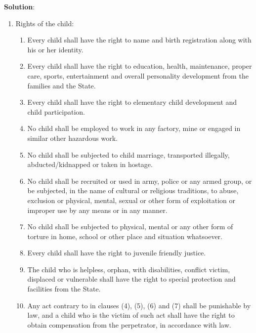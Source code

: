\documentclass[
]{book}
\newenvironment{solution}{ {\bfseries Solution}:}{}
\begin{document}
\begin{questions}
\begin{solution}
\begin{enumerate}
\item Rights of the child:
\begin{enumerate}
\item Every child shall have the right to name and birth registration along with his or her identity.
\item Every child shall have the right to education, health, maintenance, proper care, sports, entertainment and overall personality development from the families and the State.
\item Every child shall have the right to elementary child development and child participation.
\item No child shall be employed to work in any factory, mine or engaged in similar other hazardous work.
\item No child shall be subjected to child marriage, transported illegally, abducted/kidnapped or taken in hostage.
\item No child shall be recruited or used in army, police or any armed group, or be subjected, in the name of cultural or religious traditions, to abuse, exclusion or physical, mental, sexual or other form of exploitation or improper use by any means or in any manner.
\item No child shall be subjected to physical, mental or any other form of torture in home, school or other place and situation whatsoever.
\item Every child shall have the right to juvenile friendly justice.
\item The child who is helpless, orphan, with disabilities, conflict victim, displaced or vulnerable shall have the right to special protection and facilities from the State.
\item Any act contrary to in clauses (4), (5), (6) and (7) shall be punishable by law, and a child who is the victim of such act shall have the right to obtain compensation from the perpetrator, in accordance with law.
\end{enumerate}


\end{enumerate}
\end{solution}
\end{questions}
\end{document}

